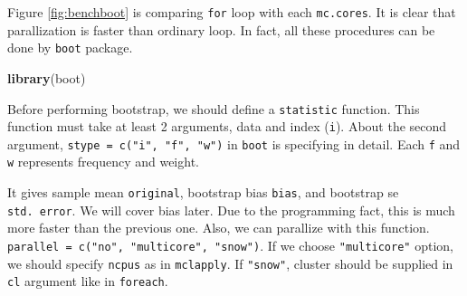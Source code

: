 \documentclass[]{book}
\newenvironment{Shaded}{\begin{snugshade}}{\end{snugshade}}
\newcommand{\CommentTok}[1]{\textcolor[rgb]{0.56,0.35,0.01}{\textit{#1}}}
\newcommand{\ControlFlowTok}[1]{\textcolor[rgb]{0.13,0.29,0.53}{\textbf{#1}}}
\newcommand{\DataTypeTok}[1]{\textcolor[rgb]{0.13,0.29,0.53}{#1}}
\newcommand{\KeywordTok}[1]{\textcolor[rgb]{0.13,0.29,0.53}{\textbf{#1}}}
\newcommand{\NormalTok}[1]{#1}
\newcommand{\OperatorTok}[1]{\textcolor[rgb]{0.81,0.36,0.00}{\textbf{#1}}}
\newcommand{\StringTok}[1]{\textcolor[rgb]{0.31,0.60,0.02}{#1}}
\theoremstyle{definition}
\theoremstyle{definition}
\theoremstyle{definition}
\theoremstyle{remark}
\begin{document}
Figure \ref{fig:benchboot} is comparing \texttt{for} loop with each \texttt{mc.cores}. It is clear that parallization is faster than ordinary loop. In fact, all these procedures can be done by \texttt{boot} package.

\begin{Shaded}
\begin{Highlighting}[]
\KeywordTok{library}\NormalTok{(boot)}
\end{Highlighting}
\end{Shaded}

Before performing bootstrap, we should define a \texttt{statistic} function. This function must take at least 2 arguments, data and index (\texttt{i}). About the second argument, \texttt{stype\ =\ c("i",\ "f",\ "w")} in \texttt{boot} is specifying in detail. Each \texttt{f} and \texttt{w} represents frequency and weight.

\begin{Shaded}
\end{Shaded}

It gives sample mean \texttt{original}, bootstrap bias \texttt{bias}, and bootstrap se \texttt{std.\ error}. We will cover bias later. Due to the programming fact, this is much more faster than the previous one. Also, we can parallize with this function. \texttt{parallel\ =\ c("no",\ "multicore",\ "snow")}. If we choose \texttt{"multicore"} option, we should specify \texttt{ncpus} as in \texttt{mclapply}. If \texttt{"snow"}, cluster should be supplied in \texttt{cl} argument like in \texttt{foreach}.
\end{document}
